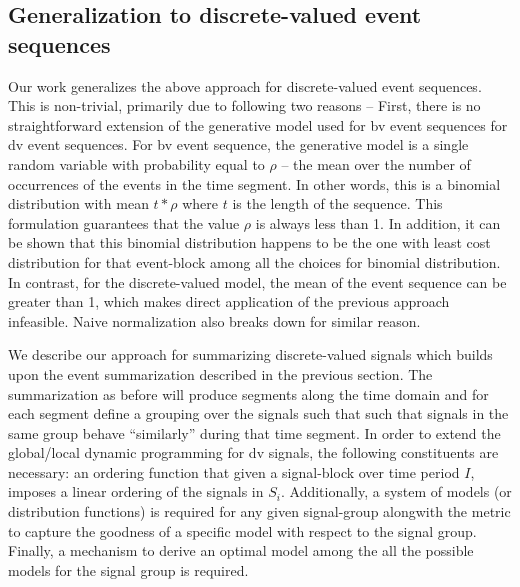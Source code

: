 

\subsection{Generalization to discrete-valued event sequences}
\label{sec:poisson}
Our work generalizes the above approach for  discrete-valued event sequences.
This is non-trivial, primarily due to following two reasons -- 
First, there is no straightforward extension of the generative model used for bv event sequences for dv event sequences. For bv event sequence, the generative model is a single random variable with probability  equal to $\rho$  -- the mean   over the number of occurrences of the events in the time segment. In other words, this is a binomial distribution with mean $t * \rho$ where $t$ is the length of the sequence.
This formulation guarantees that the value $\rho$ %
is always less than 1. In addition,
it can be shown that  this binomial distribution happens to be the one with
least cost distribution for that  event-block among all the choices
  for binomial distribution. 
  In contrast, for the discrete-valued model, the mean of the event sequence can be greater than 1, which makes direct
  application of the previous approach infeasible.  Naive normalization also breaks down for similar reason. 
  
  
We describe our approach for summarizing discrete-valued
signals which builds upon the event summarization
described in the previous section.
The summarization as before will produce segments along
the time domain and for each segment define a grouping
over the signals  such that such that signals in the same
group behave ``similarly'' during that time segment.
In order to extend the global/local dynamic programming for
dv signals, the following constituents are necessary:
an ordering function that
given a signal-block  over time period $I$,
imposes a linear ordering of the signals in $S_i$.
Additionally,  a system of models (or distribution functions)  is required for any given signal-group alongwith the
metric to capture 
the goodness of a specific model with respect to the signal group.
Finally, a mechanism to derive an optimal model among the all the possible models for the signal group is required.


